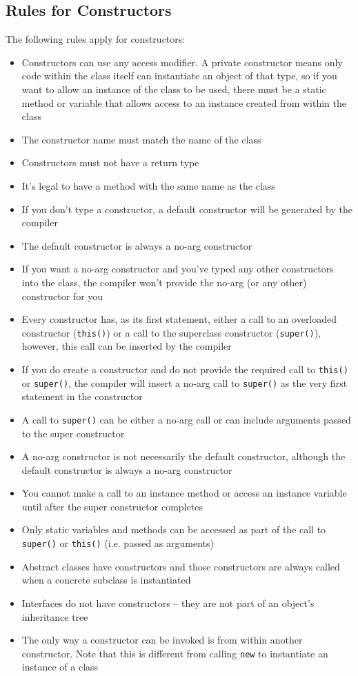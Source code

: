 \subsection{Rules for Constructors}
The following rules apply for constructors:
\begin{itemize}
    \item Constructors can use any access modifier. A private constructor means 
    only code within the class itself can instantiate an object of that type, 
    so if you want to allow an instance of the class to be used, there must be 
    a static method or variable that allows access to an instance created from 
    within the class
    \item The constructor name must match the name of the class
    \item Constructors must not have a return type
    \item It's legal to have a method with the same name as the class
    \item If you don't type a constructor, a default constructor will be 
    generated by the compiler
    \item The default constructor is always a no-arg constructor
    \item If you want a no-arg constructor and you've typed any other 
    constructors into the class, the compiler won't provide the no-arg (or any 
    other) constructor for you
    \item Every constructor has, as its first statement, either a call to an 
    overloaded constructor (\verb#this()#) or a call to the superclass 
    constructor (\verb#super()#), however, this call can be inserted by the
    compiler
    \item If you do create a constructor and do not provide the required call 
    to \verb#this()# or \verb#super()#, the compiler will insert a no-arg call 
    to \verb#super()# as the very first statement in the constructor
    \item A call to \verb#super()# can be either a no-arg call or can include 
    arguments passed to the super constructor
    \item A no-arg constructor is not necessarily the default constructor, 
    although the default constructor is always a no-arg constructor
    \item You cannot make a call to an instance method or access an instance 
    variable until after the super constructor completes
    \item Only static variables and methods can be accessed as part of the call 
    to \verb#super()# or \verb#this()# (i.e. passed as arguments)
    \item Abstract classes have constructors and those constructors are always 
    called when a concrete subclass is instantiated
    \item Interfaces do not have constructors -- they are not part of an 
    object's inheritance tree
    \item The only way a constructor can be invoked is from within another 
    constructor. Note that this is different from calling \verb#new# to 
    instantiate an instance of a class
\end{itemize}


